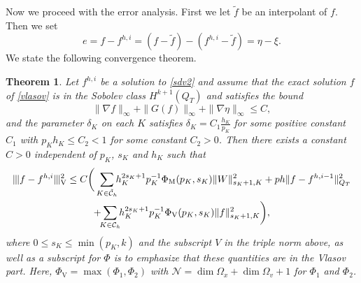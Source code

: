 \documentclass[reqno,a4paper]{amsart}
\newtheorem{theorem}{Theorem}[section]
\theoremstyle{remark}
\numberwithin{equation}{section}
\newcommand{\Vnorm}[1]{|\mkern-1mu|\mkern-1mu|#1|\mkern-1mu|\mkern-1mu|_\mathrm{V}}
\def\sumK{\sum_{K\in\mathcal{\tilde{C}}_h}\!\!}
\def\sumKV{\sum_{K\in\mathcal{C}_h}\!\!}
\begin{document}
Now we proceed with the error analysis.
First we let $ \tilde{f} $ be an interpolant of $ f $.
Then we set
\[
e= f-f^{h,i} = (f-\tilde{f}) - (f^{h,i} - \tilde{f}) = \eta- \xi.
\]
We state the following convergence theorem.
\begin{theorem} \label{bigthevla}
Let $f^{h,i}$ be a solution to \eqref{sdv2} and assume that the exact solution $f$
of \eqref{vlasov} is in the Sobolev class $ H^{k+1}(Q_T)$ and satisfies the bound
\begin{equation}\label{Vinfnorm}
\| \nabla f \|_\infty +  \| G(f) \|_\infty + \| \nabla \eta \|_\infty \leq C,
\end{equation}
and the parameter $\delta_K$ on each $K$ satisfies $\delta_K=C_1\frac{h_K}{p_K}$
for some positive constant $C_1$ with $p_Kh_K\leq C_2<1$ for some constant $C_2>0$.
Then there exists a constant $C>0$ independent of $p_K$, $s_K$ and $h_K$ such that
\begin{multline}\label{errest1}
\Vnorm{f-f^{h,i}}^2\leq 
C\bigg(\sumK h_K^{2s_K+1}p_K^{-1}\Phi_\mathrm{M}(p_K,s_K)\|W\|^2_{s_K+1,K}
+ph\|f-f^{h,i-1}\|^2_{Q_T}\\
+\!\!\sumKV h_K^{2s_K+1}p_K^{-1}\Phi_\mathrm{V}(p_K,s_K)\|f\|^2_{s_K+1,K}\bigg),
\end{multline}
where $0\leq s_K\leq\min(p_K,k)$ and the subscript $V$ in the triple norm above, 
as well as a subscript for $\Phi$ is to emphasize that
these quantities are in the Vlasov part. 
Here, $ \Phi_\mathrm{V} = \max(\Phi_1, \Phi_2) $ with
$ \mathcal{N} = \dim \Omega_x + \dim \Omega_v + 1 $ for $ \Phi_1 $ and $ \Phi_2 $.
\end{theorem}
\end{document}
